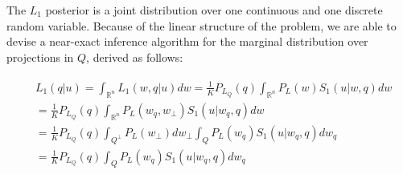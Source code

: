 \documentclass[9pt,twocolumn,twoside,lineno]{pnas-new}
\begin{document}
{	%












	The $L_1$ posterior is a joint distribution over one continuous and one discrete random variable. 
	Because of the linear structure of the problem, we are able to devise a near-exact inference algorithm for the marginal distribution over projections in $Q$, derived as follows:

























	 \begin{align}
	 \begin{split}
	&L_1(q | u) = \int_{\mathbb{R}^n}L_1(w,q | u) dw = \frac{1}{K}P_{L_Q}(q) \int_{\mathbb{R}^n}P_L(w)S_1(u|w,q) dw \\
	&= \frac{1}{K}P_{L_Q}(q) \int_{\mathbb{R}^n}P_L(w_q, w_\bot)S_1(u|w_q,q) dw \\
	&= \frac{1}{K}P_{L_Q}(q) \int_{Q^\bot}P_L(w_\bot) dw_\bot \int_{Q}P_L(w_q) S_1(u|w_q,q) dw_q \\
	&= \frac{1}{K}P_{L_Q}(q)  \int_{Q}P_L(w_q) S_1(u|w_q,q) dw_q\nonumber
	\end{split}
	 \end{align}
	



}
\end{document}
